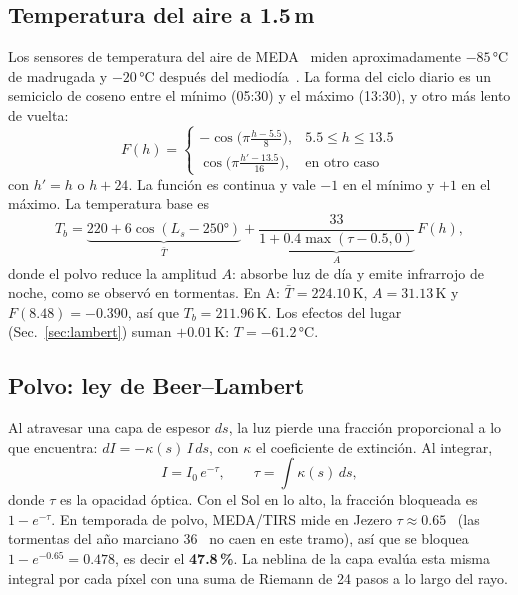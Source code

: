 \documentclass[conference]{IEEEtran}
\begin{document}
\subsection{Temperatura del aire a 1.5\,m}
Los sensores de temperatura del aire de MEDA~\cite{rodriguezmanfredi2021} miden aproximadamente $-85$\,°C de madrugada y $-20$\,°C después del mediodía~\cite{munguira2023}. La forma del ciclo diario es un semiciclo de coseno entre el mínimo (05{:}30) y el máximo (13{:}30), y otro más lento de vuelta:
\begin{equation}
F(h)=\begin{cases}-\cos\!\big(\pi\frac{h-5.5}{8}\big), & 5.5\le h\le 13.5\\[2pt] \cos\!\big(\pi\frac{h'-13.5}{16}\big), & \text{en otro caso}\end{cases}
\end{equation}
con $h' = h$ o $h+24$. La función es continua y vale $-1$ en el mínimo y $+1$ en el máximo. La temperatura base es
\begin{equation}
T_b = \underbrace{220 + 6\cos(L_s - 250°)}_{\bar T} + \underbrace{\frac{33}{1 + 0.4\max(\tau-0.5,0)}}_{A}\,F(h),
\end{equation}
donde el polvo reduce la amplitud $A$: absorbe luz de día y emite infrarrojo de noche, como se observó en tormentas. En A: $\bar T = 224.10$\,K, $A = 31.13$\,K y $F(8.48) = -0.390$, así que $T_b = 211.96$\,K. Los efectos del lugar (Sec.~\ref{sec:lambert}) suman $+0.01$\,K: $T = \mathbf{-61.2}$\,°C.

\subsection{Polvo: ley de Beer--Lambert}
Al atravesar una capa de espesor $ds$, la luz pierde una fracción proporcional a lo que encuentra: $dI = -\kappa(s)\,I\,ds$, con $\kappa$ el coeficiente de extinción. Al integrar,
\begin{equation}
I = I_0\, e^{-\tau},\qquad \tau = \int \kappa(s)\,ds,
\end{equation}
donde $\tau$ es la opacidad óptica. Con el Sol en lo alto, la fracción bloqueada es $1-e^{-\tau}$. En temporada de polvo, MEDA/TIRS mide en Jezero $\tau \approx 0.65$~\cite{smith2023} (las tormentas del año marciano 36~\cite{sanchezlavega2025} no caen en este tramo), así que se bloquea $1 - e^{-0.65} = 0.478$, es decir el \textbf{47.8\,\%}. La neblina de la capa evalúa esta misma integral por cada píxel con una suma de Riemann de 24 pasos a lo largo del rayo.
\end{document}
